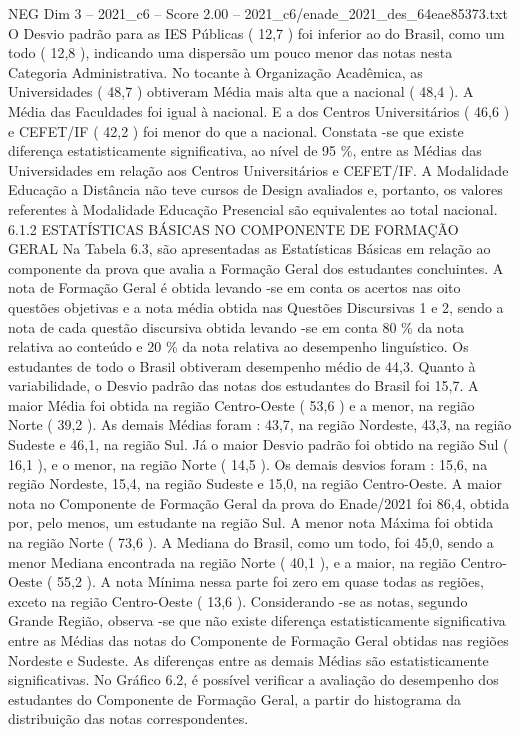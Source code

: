 \begin{textsample}{NEG Dim 3 – 2021\_c6 – Score 2.00 – 2021\_c6/enade\_2021\_des\_64eae85373.txt}
O Desvio padrão para as IES Públicas ( 12,7 ) foi inferior ao do Brasil, como um todo ( 12,8 ), indicando uma dispersão um pouco menor das notas nesta Categoria Administrativa.
No tocante à Organização Acadêmica, as Universidades ( 48,7 ) obtiveram Média mais alta que a nacional ( 48,4 ).
A Média das Faculdades foi igual à nacional.
E a dos Centros Universitários ( 46,6 ) e CEFET/IF ( 42,2 ) foi menor do que a nacional.
Constata -se que existe diferença estatisticamente significativa, ao nível de 95 \%, entre as Médias das Universidades em relação aos Centros Universitários e CEFET/IF.
A Modalidade Educação a Distância não teve cursos de Design avaliados e, portanto, os valores referentes à Modalidade Educação Presencial são equivalentes ao total nacional. 6.1.2 ESTATÍSTICAS BÁSICAS NO COMPONENTE DE FORMAÇÃO GERAL Na Tabela 6.3, são apresentadas as Estatísticas Básicas em relação ao componente da prova que avalia a Formação Geral dos estudantes concluintes.
A nota de Formação Geral é obtida levando -se em conta os acertos nas oito questões objetivas e a nota média obtida nas Questões Discursivas 1 e 2, sendo a nota de cada questão discursiva obtida levando -se em conta 80 \% da nota relativa ao conteúdo e 20 \% da nota relativa ao desempenho linguístico.
Os estudantes de todo o Brasil obtiveram desempenho médio de 44,3.
Quanto à variabilidade, o Desvio padrão das notas dos estudantes do Brasil foi 15,7.
A maior Média foi obtida na região Centro-Oeste ( 53,6 ) e a menor, na região Norte ( 39,2 ).
As demais Médias foram : 43,7, na região Nordeste, 43,3, na região Sudeste e 46,1, na região Sul.
Já o maior Desvio padrão foi obtido na região Sul ( 16,1 ), e o menor, na região Norte ( 14,5 ).
Os demais desvios foram : 15,6, na região Nordeste, 15,4, na região Sudeste e 15,0, na região Centro-Oeste.
A maior nota no Componente de Formação Geral da prova do Enade/2021 foi 86,4, obtida por, pelo menos, um estudante na região Sul.
A menor nota Máxima foi obtida na região Norte ( 73,6 ).
A Mediana do Brasil, como um todo, foi 45,0, sendo a menor Mediana encontrada na região Norte ( 40,1 ), e a maior, na região Centro-Oeste ( 55,2 ).
A nota Mínima nessa parte foi zero em quase todas as regiões, exceto na região Centro-Oeste ( 13,6 ).
Considerando -se as notas, segundo Grande Região, observa -se que não existe diferença estatisticamente significativa entre as Médias das notas do Componente de Formação Geral obtidas nas regiões Nordeste e Sudeste.
As diferenças entre as demais Médias são estatisticamente significativas.
No Gráfico 6.2, é possível verificar a avaliação do desempenho dos estudantes do Componente de Formação Geral, a partir do histograma da distribuição das notas correspondentes.

\end{textsample}
